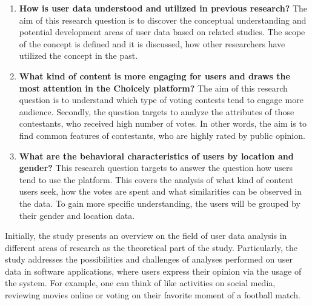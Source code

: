     \begin{enumerate}[label=RQ\arabic*:]
        \item \textbf{How is user data understood and utilized in previous research?} The aim of this research question is to discover the conceptual understanding and potential development areas of user data based on related studies. The scope of the concept is defined and it is discussed, how other researchers have utilized the concept in the past.
        
        \item \textbf{What kind of content is more engaging for users and draws the most attention in the Choicely platform?} The aim of this research question is to understand which type of voting contests tend to engage more audience. Secondly, the question targets to analyze the attributes of those contestants, who received high number of votes. In other words, the aim is to find common features of contestants, who are highly rated by public opinion.

        \item \textbf{What are the behavioral characteristics of users by location and gender?} This research question targets to answer the question how users tend to use the platform. This covers the analysis of what kind of content users seek, how the votes are spent and what similarities can be observed in the data. To gain more specific understanding, the users will be grouped by their gender and location data.


    \end{enumerate}

    Initially, the study presents an overview on the field of user data analysis in different areas of research as the theoretical part of the study. Particularly, the study addresses the possibilities and challenges of analyses performed on user data in software applications, where users express their opinion via the usage of the system. For example, one can think of like activities on social media, reviewing movies online or voting on their favorite moment of a football match.

